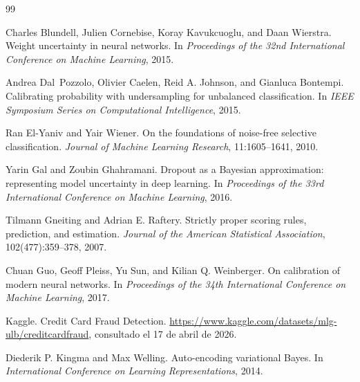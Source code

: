 \documentclass{article}
\begin{document}
\begin{thebibliography}{99}

    Charles Blundell, Julien Cornebise, Koray Kavukcuoglu, and Daan Wierstra.
    \newblock Weight uncertainty in neural networks.
    \newblock In \emph{Proceedings of the 32nd International Conference on Machine Learning}, 2015.

    Andrea Dal~Pozzolo, Olivier Caelen, Reid A. Johnson, and Gianluca Bontempi.
    \newblock Calibrating probability with undersampling for unbalanced classification.
    \newblock In \emph{IEEE Symposium Series on Computational Intelligence}, 2015.

    Ran El-Yaniv and Yair Wiener.
    \newblock On the foundations of noise-free selective classification.
    \newblock \emph{Journal of Machine Learning Research}, 11:1605--1641, 2010.

    Yarin Gal and Zoubin Ghahramani.
    \newblock Dropout as a Bayesian approximation: representing model uncertainty in deep learning.
    \newblock In \emph{Proceedings of the 33rd International Conference on Machine Learning}, 2016.

    Tilmann Gneiting and Adrian E. Raftery.
    \newblock Strictly proper scoring rules, prediction, and estimation.
    \newblock \emph{Journal of the American Statistical Association}, 102(477):359--378, 2007.

    Chuan Guo, Geoff Pleiss, Yu Sun, and Kilian Q. Weinberger.
    \newblock On calibration of modern neural networks.
    \newblock In \emph{Proceedings of the 34th International Conference on Machine Learning}, 2017.

    Kaggle.
    \newblock Credit Card Fraud Detection.
    \newblock \url{https://www.kaggle.com/datasets/mlg-ulb/creditcardfraud}, consultado el 17 de abril de 2026.

    Diederik P. Kingma and Max Welling.
    \newblock Auto-encoding variational Bayes.
    \newblock In \emph{International Conference on Learning Representations}, 2014.


\end{thebibliography}
\end{document}
